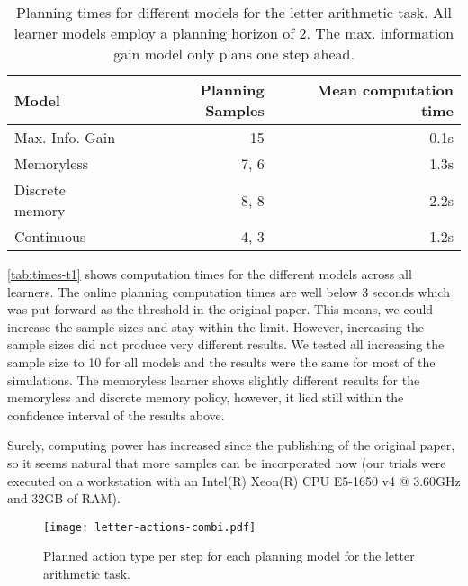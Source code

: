 \begin{table}
\centering
\small
\begin{tabular}{lr|r}
\hline
\textbf{Model}  & \textbf{Planning Samples}    & \textbf{Mean computation time}  \\
\hline
Max. Info. Gain & 15     & 0.1s                  \\
\hline
Memoryless      & 7, 6            & 1.3s                  \\
Discrete memory & 8, 8            & 2.2s                  \\
Continuous      & 4, 3            & 1.2s                  \\
\hline
\end{tabular}
\caption{Planning times for different models for the letter arithmetic task. All learner models employ a planning horizon of 2.
The max. information gain model only plans one step ahead.
}
\label{tab:times-t1}
\end{table}

\autoref{tab:times-t1} shows computation times for the different models across all learners. 
The online planning computation times are well below 3 seconds which was put forward as the threshold in the original paper. 
This means, we could increase the sample sizes and stay within the limit.
However, increasing the sample sizes did not produce very different results. We tested all increasing the sample size to 10 for all models and the results were the same for most of the simulations. The memoryless learner shows slightly different results for the memoryless and discrete memory policy, however, it lied still within the confidence interval of the results above.

Surely, computing power has increased since the publishing of the original paper, so it seems natural that more samples can be incorporated now (our trials were executed on a workstation with an Intel(R) Xeon(R) CPU E5-1650 v4 @ 3.60GHz and 32GB of RAM).

\begin{figure}
    \centering
    \texttt{[image: letter-actions-combi.pdf]}
    \caption{Planned action type per step for each planning model for the letter arithmetic task. 
    }
    \label{fig:actions-t1}
\end{figure}

